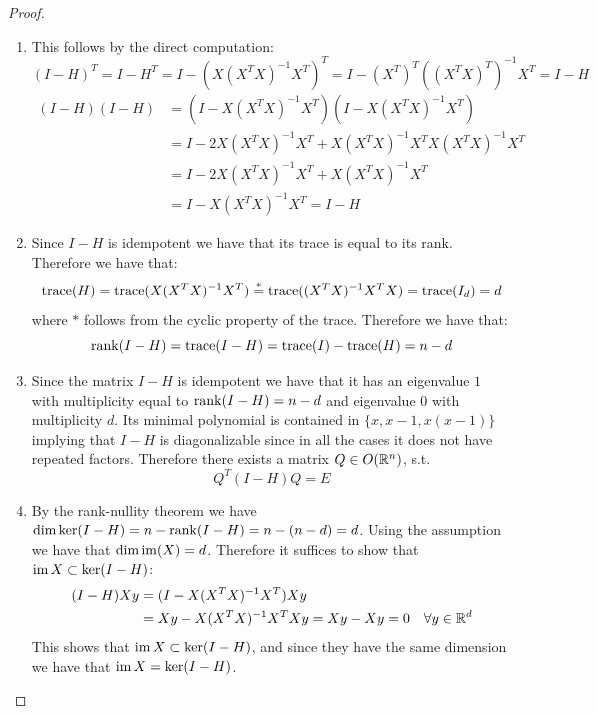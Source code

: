 \begin{proof} \hfill 
    \begin{enumerate}                                                                                                                    
        \item This follows by the direct computation:
              \[(I - H)^T 
                  = I - H^T 
                  = I - (X (X^TX)^{-1}X^T)^T
                  = I - (X^T)^T \left((X^TX)^T\right)^{-1} X^T
                  = I - H\]
              \begin{align*}                                                     
                  (I - H)(I - H)
                   & = (I - X (X^TX)^{-1}X^T)(I - X (X^TX)^{-1}X^T)
                  \\ & = I - 2 X (X^TX)^{-1}X^T + X (X^TX)^{-1}X^T X (X^TX)^{-1}X^T
                  \\ & = I - 2 X (X^TX)^{-1}X^T + X (X^TX)^{-1} X^T                 
                  \\ & = I - X (X^TX)^{-1}X^T
                  = I - H
              \end{align*}
        \item Since $I - H$ is idempotent we have that its trace is equal to its rank. Therefore we have that:
              \[\operatorname{trace}(H) 
                  = \operatorname{trace}(X (X^TX)^{-1}X^T)
                  \overset{*}{=} \operatorname{trace}((X^TX)^{-1} X^T X)
                  = \operatorname{trace}(I_d)
                  = d\]
              where $*$ follows from the cyclic property of the trace. Therefore we have that:
              \[\operatorname{rank}(I - H) = \operatorname{trace}(I - H) = \operatorname{trace}(I) - \operatorname{trace}(H) = n - d\]
        \item Since the matrix $I - H$ is idempotent we have that it has an eigenvalue $1$ with multiplicity equal to $\operatorname{rank}(I - H) = n - d$ and eigenvalue $0$ with multiplicity $d$. Its minimal polynomial is contained in $\{x, x-1, x(x-1)\}$ implying that $I - H$ is diagonalizable since in all the cases it does not have repeated factors. Therefore there exists a matrix $Q \in O(\mathbb{R}^n)$, s.t. 
              \[Q^T (I - H) Q = E\]
        \item By the rank-nullity theorem we have $\dim \ker(I - H) = n - \operatorname{rank}(I - H) = n - (n - d) = d$. Using the assumption we have that $\dim \operatorname{im}(X) = d$. Therefore it suffices to show that $\operatorname{im} X \subset \ker(I - H)$:
              \begin{align*}                                
                  (I - H)Xy 
                   & = (I - X(X^TX)^{-1}X^T)Xy 
                  \\ &= Xy - X(X^TX)^{-1}X^TXy
                  = Xy - Xy = 0 \quad \forall y \in \mathbb{R}^d
              \end{align*}
              This shows that $\operatorname{im} X \subset \ker(I - H)$, and since they have the same dimension we have that $\operatorname{im} X = \ker(I - H)$.
    \end{enumerate}
\end{proof}

